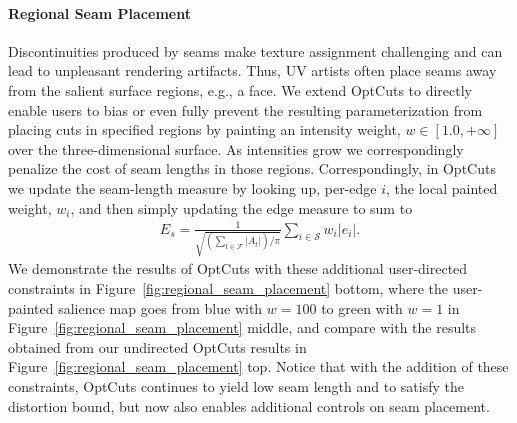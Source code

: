 \paragraph{Regional Seam Placement}
Discontinuities produced by seams make texture assignment challenging and can lead to unpleasant rendering artifacts. Thus, UV artists often place seams away from the salient surface regions, e.g., a face. We extend OptCuts to directly enable users to bias or even fully prevent the resulting parameterization from placing cuts in specified regions by painting an intensity weight, $w \in [1.0, +\infty]$ over the three-dimensional surface. As intensities grow we correspondingly penalize the cost of seam lengths in those regions. Correspondingly, in OptCuts we update the seam-length measure by looking up, per-edge $i$, the local painted weight, $w_{i}$, and then simply updating the edge measure to sum to 
\begin{align}
E_s = \frac{1}{\sqrt{(\sum_{t\in\mathcal{F}} |A_t|)/\pi}} \sum_{i \in \mathcal{S}} w_i |e_i|.
\end{align}
%
We demonstrate the results of OptCuts with these additional user-directed constraints in Figure~\ref{fig:regional_seam_placement} bottom, where the user-painted salience map goes from blue with $w = 100$ to green with $w = 1$ in Figure~\ref{fig:regional_seam_placement} middle, and compare with the results obtained from our undirected OptCuts results in Figure~\ref{fig:regional_seam_placement} top. Notice that with the addition of these constraints, OptCuts continues to yield low seam length and to satisfy the distortion bound, but now also enables additional controls on seam placement.
 
%


